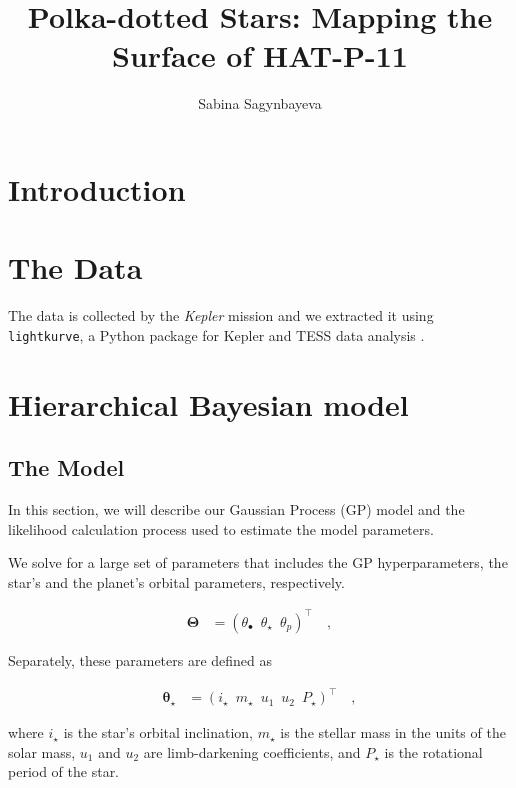 \documentclass[twocolumn]{aastex631}
\begin{document}
\title{Polka-dotted Stars: Mapping the Surface of HAT-P-11}

\author{Sabina Sagynbayeva}

\begin{abstract}
   
\end{abstract}

\section{Introduction}
\label{sec:intro}

%
\section{The Data}
The data is collected by the \emph{Kepler} mission and we extracted it using
\texttt{lightkurve}, a Python package for Kepler and TESS data analysis \citep{lightkurve}.
%
%
\section{Hierarchical Bayesian model}

%
\subsection{The Model}
In this section, we will describe our Gaussian Process (GP) model and the likelihood calculation process used to estimate the model parameters. 

We solve for a large set of parameters that includes the GP hyperparameters, the star's and the planet's orbital parameters, respectively. 
\begin{linenomath}\begin{align}
    \label{eq:largetheta}
    \pmb{\Theta}
     & =
    \left(
    \theta_\bullet
    \,\,\,
    \theta_\star
    \,\,\,
    \theta_p
    \right)^\top
    \quad,
\end{align}\end{linenomath}

Separately, these parameters are defined as 
\begin{linenomath}\begin{align}
    \label{eq:thetastar}
    \pmb{\theta_\star}
     & =
    \left(
    i_\star
    \,\,\,
    m_\star
    \,\,\,
    u_1
    \,\,\,
    u_2
    \,\,\,
    P_\star
    \right)^\top
    \quad,
\end{align}\end{linenomath}
where $i_\star$ is the star's orbital inclination, $m_\star$ is the stellar mass in the units of the solar mass, $u_1$ and $u_2$ are limb-darkening coefficients,
and $P_\star$ is the rotational period of the star.
\end{document}
